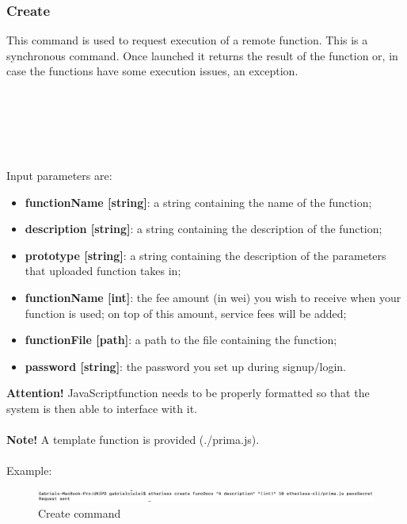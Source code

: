 \subsubsection{Create}
This command is used to request execution of a remote function. This is a synchronous command. Once launched it returns the result of the function or, in case the functions have some execution issues, an exception.\\\\
\centerline{}\\\\
\\\\
Input parameters are:
\begin{itemize}
	\item \textbf{functionName [string]}: a string containing the name of the function;
	\item \textbf{description [string]}: a string containing the description of the function;
	\item \textbf{prototype [string]}: a string containing the description of the parameters that uploaded function takes in;
	\item \textbf{functionName [int]}: the fee amount (in wei) you wish to receive when your function is used; on top of this amount, service fees will be added;
	\item \textbf{functionFile [path]}: a path to the file containing the function;
	\item \textbf{password [string]}: the password you set up during signup/login.
\end{itemize}
\textbf{Attention!} JavaScript\glo function needs to be properly formatted so that the system is then able to interface with it.\\\\
\textbf{Note!} A template function is provided (./prima.js).\\\\
Example:
\begin{figure}[h]
	\centering
	\includegraphics[width=\textwidth]{res/img/create.png}
	\caption{Create command}
\end{figure}

